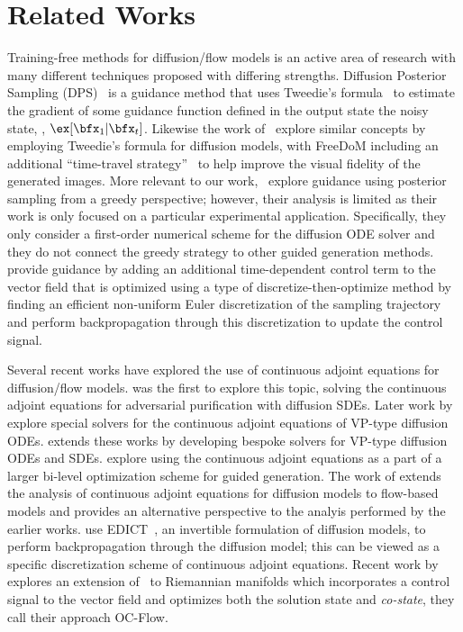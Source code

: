 \section{Related Works}
Training-free methods for diffusion/flow models is an active area of research with many different techniques proposed with differing strengths.
Diffusion Posterior Sampling (DPS)~\citep{chung2023diffusion} is a guidance method that uses Tweedie's formula~\citep{stein1981estimation} to estimate the gradient of some guidance function defined in the output state \wrt the noisy state, \ie, $\ex[\bfx_1|\bfx_t]$. 
Likewise the work of~\citet{bansal2023universal,wang2023zeroshot,yu2023freedom} explore similar concepts by employing Tweedie's formula for diffusion models, with FreeDoM including an additional ``time-travel strategy''~\citep{wang2023zeroshot} to help improve the visual fidelity of the generated images.
More relevant to our work,~\citet{blasingame2024greedydim} explore guidance using posterior sampling from a greedy perspective; however, their analysis is limited as their work is only focused on a particular experimental application.
Specifically, they only consider a first-order numerical scheme for the diffusion ODE solver and they do not connect the greedy strategy to other guided generation methods.
\citet{liu2023flowgrad} provide guidance by adding an additional time-dependent control term to the vector field that is optimized using a type of discretize-then-optimize
method by finding an efficient non-uniform Euler discretization of the sampling trajectory and perform backpropagation through this discretization to update the control signal.


Several recent works have explored the use of continuous adjoint equations for diffusion/flow models.
\citet{nie2022diffpure} was the first to explore this topic, solving the continuous adjoint equations for adversarial purification with diffusion SDEs.
Later work by~\cite{pan2024adjointdpm,pan2023adjointsymplectic} explore special solvers for the continuous adjoint equations of VP-type diffusion ODEs.
\citet{blasingame2024adjointdeis} extends these works by developing bespoke solvers for VP-type diffusion ODEs and SDEs.
\citet{marion2024implicit} explore using the continuous adjoint equations as a part of a larger bi-level optimization scheme for guided generation.
The work of \citet{ben-hamu2024dflow} extends the analysis of continuous adjoint equations for diffusion models to flow-based models and provides an alternative perspective to the analyis performed by the earlier works.
\citet{wallace2023end} use EDICT~\citep{wallace2023edict}, an invertible formulation of diffusion models, to perform backpropagation through the diffusion model; this can be viewed as a specific discretization scheme of continuous adjoint equations.
Recent work by~\citet{wang2024training} explores an extension of~\citet{ben-hamu2024dflow} to Riemannian manifolds which incorporates a control signal to the vector field and optimizes both the solution state and \textit{co-state}, they call their approach OC-Flow.